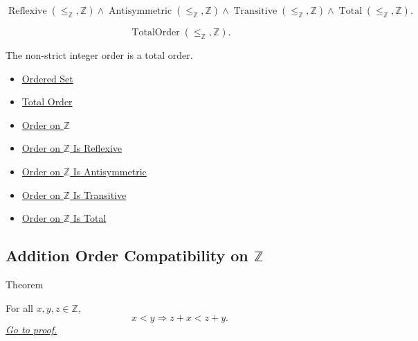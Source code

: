\begin{remark*}
\[
\operatorname{Reflexive}(\le_{\mathbb{Z}},\mathbb{Z})
\land
\operatorname{Antisymmetric}(\le_{\mathbb{Z}},\mathbb{Z})
\land
\operatorname{Transitive}(\le_{\mathbb{Z}},\mathbb{Z})
\land
\operatorname{Total}(\le_{\mathbb{Z}},\mathbb{Z}).
\]
\end{remark*}

\begin{remark*}
\[
\operatorname{TotalOrder}(\le_{\mathbb{Z}},\mathbb{Z}).
\]
\end{remark*}

\begin{remark*}[Interpretation]
The non-strict integer order is a total order.
\end{remark*}

\begin{dependencies}
\begin{itemize}
  \item \hyperref[def:ordered-set]{Ordered Set}
  \item \hyperref[def:total-order]{Total Order}
  \item \hyperref[def:order-on-z]{Order on $\mathbb{Z}$}
  \item \hyperref[thm:order-on-z-reflexive]{Order on $\mathbb{Z}$ Is Reflexive}
  \item \hyperref[thm:order-on-z-antisymmetric]{Order on $\mathbb{Z}$ Is Antisymmetric}
  \item \hyperref[thm:order-on-z-transitive]{Order on $\mathbb{Z}$ Is Transitive}
  \item \hyperref[thm:order-on-z-total]{Order on $\mathbb{Z}$ Is Total}
\end{itemize}
\end{dependencies}

\subsection*{\texorpdfstring{Addition Order Compatibility on $\mathbb{Z}$}{Addition Order Compatibility on Z}}

\begin{theorembox}{Theorem}
\begin{theorem}
\label{thm:left-addition-preserves-strict-order-on-z}
For all $x,y,z\in\mathbb{Z}$,
\[
x<y \Longrightarrow z+x<z+y.
\]
\hyperref[prf:left-addition-preserves-strict-order-on-z]{\textit{Go to proof.}}
\end{theorem}
\end{theorembox}

